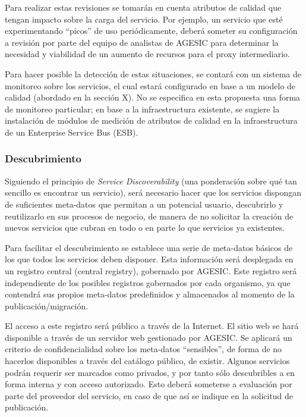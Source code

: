 \documentclass[11pt]{article}
\begin{document}
				Para realizar estas revisiones se tomarán en cuenta atributos de calidad que tengan impacto sobre la carga del servicio. Por ejemplo, un servicio que esté experimentando “picos” de uso periódicamente, deberá someter su configuración a revisión por parte del equipo de analistas de AGESIC para determinar la necesidad y viabilidad de un aumento de recursos para el proxy intermediario.

				Para hacer posible la detección de estas situaciones, se contará con un sistema de monitoreo sobre los servicios, el cual estará configurado en base a un modelo de calidad (abordado en la sección X). No se especifica en esta propuesta una forma de monitoreo particular; en base a la infraestructura existente, se sugiere la instalación de módulos de medición de atributos de calidad en la infraestructura de un Enterprise Service Bus (ESB).

			\subsubsection{Descubrimiento}
				Siguiendo el principio de \emph{Service Discoverability} (una ponderación sobre qué tan sencillo es encontrar un servicio), será necesario hacer que los servicios dispongan de suficientes meta-datos que permitan a un potencial usuario, descubrirlo y reutilizarlo en sus procesos de negocio, de manera de no solicitar la creación de nuevos servicios que cubran en todo o en parte lo que servicios ya existentes.

				Para facilitar el descubrimiento se establece una serie de meta-datos básicos de los que todos los servicios deben disponer. Esta información será desplegada en un registro central (central registry), gobernado por AGESIC. Este registro será independiente de los posibles registros gobernados por cada organismo, ya que contendrá sus propios meta-datos predefinidos y almacenados al momento de la publicación/migración.

				El acceso a este registro será público a través de la Internet. El sitio web se hará disponible a través de un servidor web gestionado por AGESIC. Se aplicará un criterio de confidencialidad sobre los meta-datos “sensibles”, de forma de no hacerlos disponibles a través del catálogo público, de existir.
				Algunos servicios podrán requerir ser marcados como privados, y por tanto sólo descubribles a en forma interna y con acceso autorizado. Esto deberá someterse a evaluación por parte del proveedor del servicio, en caso de que así se indique en la solicitud de publicación.
\end{document}
